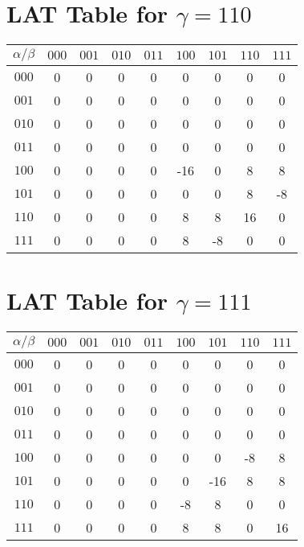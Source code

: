 \documentclass{article}
\begin{document}
\section*{LAT Table for $\gamma = 110$}\n\begin{center}
\begin{tabular}{c|cccccccc}
 $ \alpha / \beta $ & $000$ & $001$ & $010$ & $011$ & $100$ & $101$ & $110$ & $111$  \\
\midrule
$000$ & 0 & 0 & 0 & 0 & 0 & 0 & 0 & 0  \\
$001$ & 0 & 0 & 0 & 0 & 0 & 0 & 0 & 0  \\
$010$ & 0 & 0 & 0 & 0 & 0 & 0 & 0 & 0  \\
$011$ & 0 & 0 & 0 & 0 & 0 & 0 & 0 & 0  \\
$100$ & 0 & 0 & 0 & 0 & -16 & 0 & 8 & 8  \\
$101$ & 0 & 0 & 0 & 0 & 0 & 0 & 8 & -8  \\
$110$ & 0 & 0 & 0 & 0 & 8 & 8 & 16 & 0  \\
$111$ & 0 & 0 & 0 & 0 & 8 & -8 & 0 & 0  \\
\end{tabular}
\end{center}

\section*{LAT Table for $\gamma = 111$}\n\begin{center}
\begin{tabular}{c|cccccccc}
 $ \alpha / \beta $ & $000$ & $001$ & $010$ & $011$ & $100$ & $101$ & $110$ & $111$  \\
\midrule
$000$ & 0 & 0 & 0 & 0 & 0 & 0 & 0 & 0  \\
$001$ & 0 & 0 & 0 & 0 & 0 & 0 & 0 & 0  \\
$010$ & 0 & 0 & 0 & 0 & 0 & 0 & 0 & 0  \\
$011$ & 0 & 0 & 0 & 0 & 0 & 0 & 0 & 0  \\
$100$ & 0 & 0 & 0 & 0 & 0 & 0 & -8 & 8  \\
$101$ & 0 & 0 & 0 & 0 & 0 & -16 & 8 & 8  \\
$110$ & 0 & 0 & 0 & 0 & -8 & 8 & 0 & 0  \\
$111$ & 0 & 0 & 0 & 0 & 8 & 8 & 0 & 16  \\
\end{tabular}
\end{center}
\end{document}
